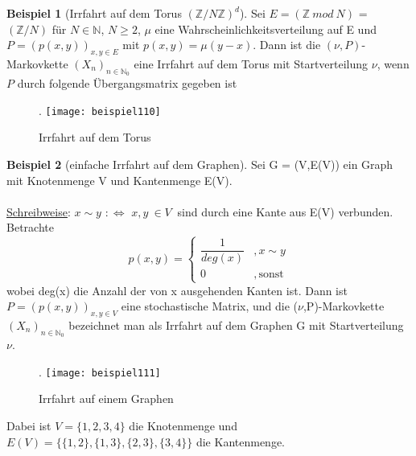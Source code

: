 \documentclass[a4paper,12pt]{scrartcl}
\theoremstyle{definition}
\newtheorem{bsp}{Beispiel}[section]
\begin{document}
\begin{bsp}[Irrfahrt auf dem Torus ${(\mathbb{Z}/N\mathbb{Z})}^{d}$]
Sei $E = (\mathbb{Z} \: mod \: N)$ = $( \mathbb{Z}/N)$ für $N \in \mathbb{N}$, $N \ge 2$, $\mu$ eine Wahrscheinlichkeitsverteilung auf E  und $P =(p(x,y))_{x,y \in E}$ mit $p(x,y) = \mu(y-x)$. Dann ist die $(\nu,P)$-Markovkette $(X_{n})_{n \in \mathbb{N}_{0}}$ eine Irrfahrt auf dem Torus mit Startverteilung $\nu$, wenn $P$ durch folgende Übergangsmatrix gegeben ist
\begin{figure}[H].
\centering
\texttt{[image: beispiel110]}
\caption{Irrfahrt auf dem Torus}
\end{figure}
\end{bsp}
\begin{bsp}[einfache Irrfahrt auf dem Graphen]
Sei G = (V,E(V)) ein Graph mit Knotenmenge V und Kantenmenge E(V).
\\
\\
\underline{Schreibweise}: $x \sim y$ $:\Leftrightarrow$ $x,y \: \in V \:$ sind durch eine Kante aus E(V) verbunden. Betrachte
\begin{equation*}
p(x,y)=
\begin{cases}
\dfrac{1}{deg(x)} &  ,x \sim y\\
0 & ,\mathrm{sonst}
\end{cases}
\end{equation*}
wobei deg(x) die Anzahl der von x ausgehenden Kanten ist. Dann ist $P =(p(x,y))_{x,y \in V}$ eine stochastische Matrix, und die ($\nu$,P)-Markovkette  $(X_{n})_{n \in \mathbb{N}_{0}}$ bezeichnet man als Irrfahrt auf dem Graphen G mit Startverteilung $\nu$. 
\begin{figure}[H].
\centering
\texttt{[image: beispiel111]}
\caption{Irrfahrt auf einem Graphen}
\end{figure}
\noindent
Dabei ist $V = \lbrace 1,2,3,4 \rbrace$ die Knotenmenge und $E(V) = \lbrace \lbrace 1,2 \rbrace, \lbrace 1,3 \rbrace, \lbrace 2,3 \rbrace, \lbrace 3,4 \rbrace \rbrace$ die Kantenmenge.
\end{bsp}
\end{document}
